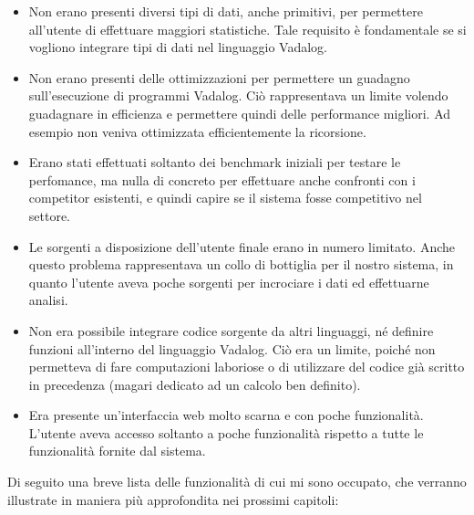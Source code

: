 \begin{itemize}
	\item Non erano presenti diversi tipi di dati, anche primitivi, per permettere all'utente di effettuare maggiori statistiche. Tale requisito è fondamentale se si vogliono integrare tipi di dati nel linguaggio Vadalog.
	\item Non erano presenti delle ottimizzazioni per permettere un guadagno sull'esecuzione di programmi Vadalog. Ciò rappresentava un limite volendo guadagnare in efficienza e permettere quindi delle performance migliori. Ad esempio non veniva ottimizzata efficientemente la ricorsione. 
	\item Erano stati effettuati soltanto dei benchmark iniziali per testare le perfomance, ma nulla di concreto per effettuare anche confronti con i competitor esistenti, e quindi capire se il sistema fosse competitivo nel settore.
	\item Le sorgenti a disposizione dell'utente finale erano in numero limitato. Anche questo problema rappresentava un collo di bottiglia per il nostro sistema, in quanto l'utente aveva poche sorgenti per incrociare i dati ed effettuarne analisi. 
	\item Non era possibile integrare codice sorgente da altri linguaggi, né definire funzioni all'interno del linguaggio Vadalog. Ciò era un limite, poiché non permetteva di fare computazioni laboriose o di utilizzare del codice già scritto in precedenza (magari dedicato ad un calcolo ben definito).
	\item Era presente un'interfaccia web molto scarna e con poche funzionalità. L'utente aveva accesso soltanto a poche funzionalità rispetto a tutte le funzionalità fornite dal sistema.
\end{itemize}
Di seguito una breve lista delle funzionalità di cui mi sono occupato, che verranno illustrate in maniera più approfondita nei prossimi capitoli:
